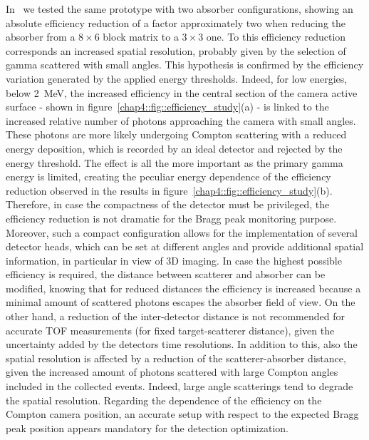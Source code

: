 In~\cite{Fontana2017_APPB} we tested the same prototype with two absorber configurations, showing an absolute efficiency reduction of a factor approximately two when reducing the absorber from a $8\times6$ block matrix to a $3\times3$ one. To this efficiency reduction corresponds an increased spatial resolution, probably given by the selection of gamma scattered with small angles. This hypothesis is confirmed by the efficiency variation generated by the applied energy thresholds. Indeed, for low energies, below 2~MeV, the increased efficiency in the central section of the camera active surface - shown in figure~\ref{chap4::fig::efficiency_study}(a) - is linked to the increased relative number of photons approaching the camera with small angles. These photons are more likely undergoing Compton scattering with a reduced energy deposition, which is recorded by an ideal detector and rejected by the energy threshold. The effect is all the more important as the primary gamma energy is limited, creating the peculiar energy dependence of the efficiency reduction observed in the results in figure~\ref{chap4::fig::efficiency_study}(b). Therefore, in case the compactness of the detector must be privileged, the efficiency reduction is not dramatic for the Bragg peak monitoring purpose. Moreover, such a compact configuration allows for the implementation of several detector heads, which can be set at different angles and provide additional spatial information, in particular in view of 3D imaging. In case the highest possible efficiency is required, the distance between scatterer and absorber can be modified, knowing that for reduced distances the efficiency is increased because a minimal amount of scattered photons escapes the absorber field of view. On the other hand, a reduction of the inter-detector distance is not recommended for accurate TOF measurements (for fixed target-scatterer distance), given the uncertainty added by the detectors time resolutions. In addition to this, also the spatial resolution is affected by a reduction of the scatterer-absorber distance, given the increased amount of photons scattered with large Compton angles included in the collected events. Indeed, large angle scatterings tend to degrade the spatial resolution.   
Regarding the dependence of the efficiency on the Compton camera position, an accurate setup with respect to the expected Bragg peak position appears mandatory for the detection optimization.

